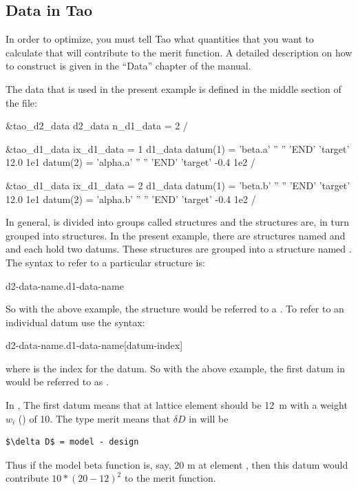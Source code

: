 \documentclass{hitec}
\begin{document}
\subsection{Data in Tao}
\label{s:data}

In order to optimize, you must tell Tao what quantities that you want to calculate that will
contribute to the merit function. A detailed description on how to construct  is given
in the ``Data'' chapter of the \tao manual.

The data that is used in the present example is defined in
the middle section of the  file:
\begin{code}
&tao_d2_data
  d2_data%
  n_d1_data = 2
/

&tao_d1_data
  ix_d1_data = 1
  d1_data%
  datum(1) =  'beta.a'     '' '' 'END'   'target'  12.0   1e1
  datum(2) =  'alpha.a'    '' '' 'END'   'target' -0.4    1e2
/

&tao_d1_data
  ix_d1_data = 2
  d1_data%
  datum(1) =  'beta.b'     '' '' 'END'   'target'  12.0   1e1
  datum(2) =  'alpha.b'    '' '' 'END'   'target' -0.4    1e2
/
\end{code}
In general,  is divided into groups called  structures and the
 structures are, in turn grouped into  structures. In the present example,
there are  structures named  and  and each hold two datums. These
 structures are grouped into a  structure named .
The syntax to refer to a 
particular  structure is:
\begin{code}
  d2-data-name.d1-data-name
\end{code}
So with the above example, the  structure would be referred to a  . To refer to an
individual datum use the syntax:
\begin{code}
  d2-data-name.d1-data-name[datum-index]
\end{code}
where  is the index for the datum. So with the above example, the first datum in
 would be referred to as  .

In , The first datum means that  at lattice element  should be 12~m
with a weight $w_i$ () of 10. The  type merit means that $\delta D$ in  will
be
\begin{lstlisting}[mathescape]
$\delta D$ = model - design
\end{lstlisting}
Thus if the model beta function is, say, 20 m at element , then this datum would contribute
$10*(20 - 12)^2$ to the merit function.
\end{document}

